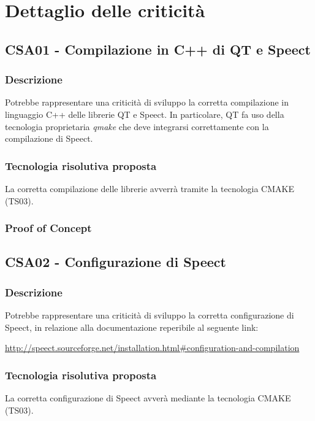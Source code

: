 \documentclass[./../Technology Baseline.tex]{subfiles}
\begin{document}
\section{Dettaglio delle criticità}

\subsection{CSA01 - Compilazione in C++ di QT e Speect}

\subsubsection{Descrizione}
Potrebbe rappresentare una criticità di sviluppo la corretta compilazione in linguaggio C++ delle librerie QT e Speect. In particolare, QT fa uso della tecnologia proprietaria \textit{qmake} che deve integrarsi correttamente con la compilazione di Speect.

\subsubsection{Tecnologia risolutiva proposta}
La corretta compilazione delle librerie avverrà tramite la tecnologia CMAKE (TS03).

\subsubsection{Proof of Concept}

\subsection{CSA02 - Configurazione di Speect}

\subsubsection{Descrizione}
Potrebbe rappresentare una criticità di sviluppo la corretta configurazione di Speect, in relazione alla documentazione reperibile al seguente link:

\begin{center}
	\url{http://speect.sourceforge.net/installation.html#configuration-and-compilation}
\end{center}

\subsubsection{Tecnologia risolutiva proposta}
La corretta configurazione di Speect avverà mediante la tecnologia CMAKE (TS03).
\end{document}
